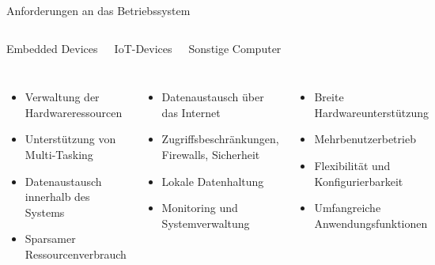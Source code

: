 {
\small
\setlength{\leftmargini}{1.2em}

\begin{frame}{Anforderungen an das Betriebssystem}
    \begin{columns}[T]
        \begin{block}{Embedded Devices}
        \end{block}

        \begin{block}{IoT-Devices}
        \end{block}

        \begin{block}{Sonstige Computer}
        \end{block}
    \end{columns}

    \begin{columns}[T]
        \begin{itemize}
            \item Verwaltung der Hardwareressourcen
            \item Unterstützung von Multi-Tasking
            \item Datenaustausch innerhalb des Systems
            \item Sparsamer Ressourcenverbrauch
        \end{itemize}

        \begin{itemize}
            \item Datenaustausch über das Internet
            \item Zugriffsbeschränkungen, Firewalls, Sicherheit
            \item Lokale Datenhaltung
            \item Monitoring und Systemverwaltung
        \end{itemize}

        \begin{itemize}
            \item Breite Hardwareunterstützung
            \item Mehrbenutzerbetrieb
            \item Flexibilität und Konfigurierbarkeit
            \item Umfangreiche Anwendungsfunktionen
        \end{itemize}
    \end{columns}


\end{frame}}
